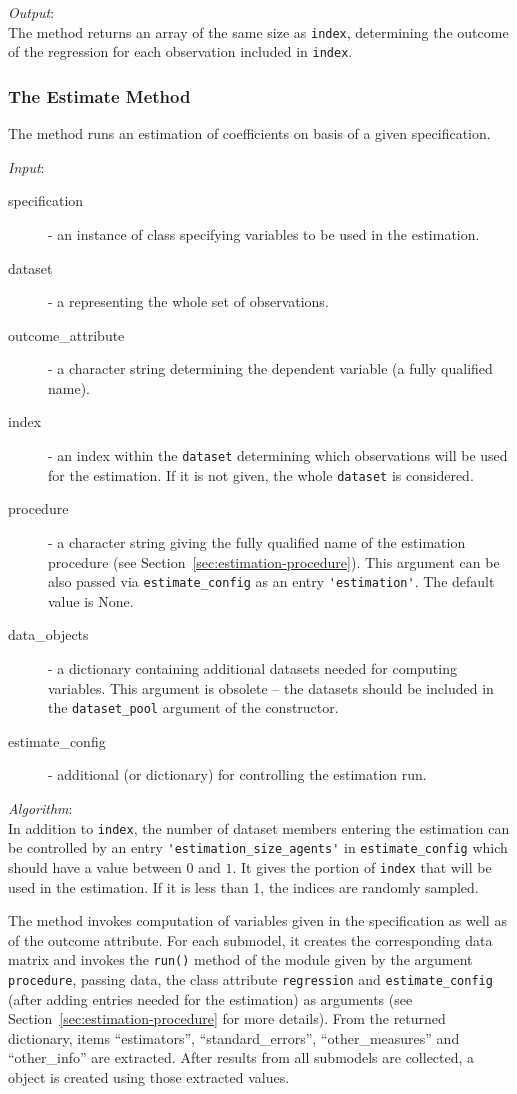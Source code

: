 {\it Output}:~\\[1mm]
The method returns an array of the same size as \verb|index|, determining the
outcome of the regression for each observation included in \verb|index|.

\subsubsection{The Estimate Method}
The  method runs an estimation of coefficients on basis of
a given specification.

{\it Input}:
\begin{description}
\item[specification] - an instance of class 
  specifying variables to be used in the estimation.
\item[dataset] - a  representing the whole set of observations.
\item[outcome_attribute] - a character string determining the dependent
  variable (a fully qualified name).
\item[index] - an index within the \verb|dataset| determining which
  observations will be used for the estimation. If it is not given, the whole
  \verb|dataset| is considered.
\item[procedure] - a character string giving the fully qualified name of the
  estimation procedure (see Section~\ref{sec:estimation-procedure}). This argument can be also passed via
  \verb|estimate_config| as an entry \verb|'estimation'|. The default value is None.
\item[data_objects] - a dictionary containing additional datasets 
  needed for computing variables. This argument is obsolete -- the datasets should be 
  included in the \verb|dataset_pool| argument of the constructor.
\item[estimate_config] - additional  (or dictionary) for controlling the
  estimation run.
\end{description}

{\it Algorithm}:~\\[1mm]
In addition to \verb|index|, the number of dataset members entering the
estimation can be controlled by an entry \verb|'estimation_size_agents'| in
\verb|estimate_config| which should have a value between $0$ and $1$. It gives
the portion of \verb|index| that will be used in the estimation. If it is less than 1, 
the indices are randomly sampled.

The method invokes computation of variables given in the specification as well
as of the outcome attribute. For each submodel, it creates the corresponding
data matrix and invokes the \verb|run()| method of the module given by the
argument \verb|procedure|, passing data, the class attribute \verb|regression|
and \verb|estimate_config| (after adding entries needed for the estimation) as
arguments (see Section~\ref{sec:estimation-procedure} for more details). From
the returned dictionary, items ``estimators'', ``standard_errors'',
``other_measures'' and ``other_info'' are extracted.  After results from all
submodels are collected, a  object is created using those
extracted values.

